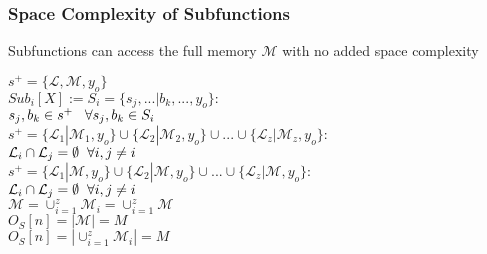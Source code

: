 \documentclass[11pt]{article}
\begin{document}
\subsubsection{Space Complexity of Subfunctions}
Subfunctions can access the full memory $\mathcal{M}$ with no added space complexity 
\begin{center}
\vspace{1mm}
$
s^+ = \{ \mathcal{L},\mathcal{M},y_o\}
$
\\ \vspace{6mm}
$
Sub_i[X] := S_i = \{s_j,...|b_k,...,y_o\}:
$
\\ \vspace{2mm}
$
s_j,b_k \in s^+ \hspace{3mm} \forall s_j,b_k \in S_i
$
\\ \vspace{6mm}
$
s^+ = \{ \mathcal{L}_1| \mathcal{M}_1,y_o\} \cup \{  \mathcal{L}_2| \mathcal{M}_2,y_o\} \cup ... \cup \{  \mathcal{L}_z| \mathcal{M}_z,y_o\} :
$
\\ \vspace{2mm}
$
\mathcal{L}_i \cap \mathcal{L}_j = \emptyset \hspace{2mm} \forall i,j\neq i
$
\\ \vspace{4mm}
$
s^+ = \{ \mathcal{L}_1| \mathcal{M},y_o\} \cup \{  \mathcal{L}_2| \mathcal{M},y_o\} \cup ... \cup \{  \mathcal{L}_z| \mathcal{M},y_o\} :
$
\\ \vspace{2mm}
$
\mathcal{L}_i \cap \mathcal{L}_j = \emptyset \hspace{2mm} \forall i,j\neq i
$
\\ \vspace{4mm}
$
\mathcal{M} = \cup_{i=1}^z \mathcal{M}_i  = \cup_{i=1}^z \mathcal{M}
$
\\ \vspace{4mm}
$
O_S[n] = |\mathcal{M}| = M
$
\\ \vspace{2mm}
$
O_S[n] = |\cup_{i=1}^z \mathcal{M}_i| = M
$
\end{center}
\end{document}
